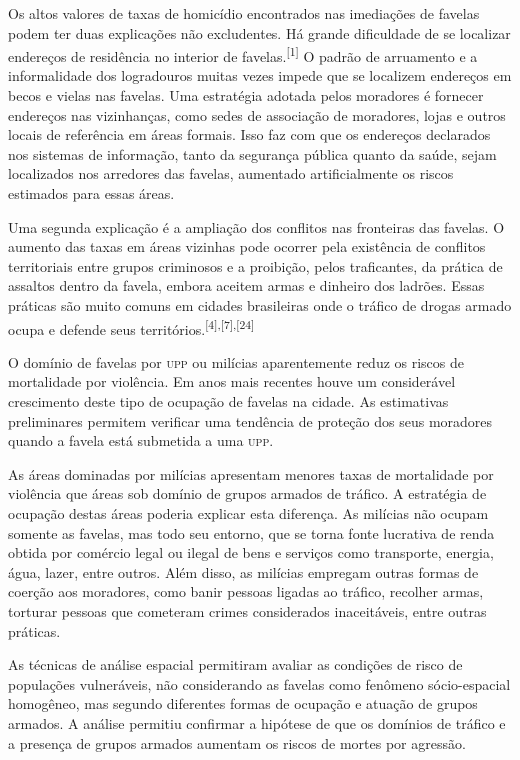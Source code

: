 \documentclass{article}
\begin{document}
Os altos valores de taxas de homicídio encontrados nas imediações de favelas
podem ter duas explicações não excludentes. Há grande dificuldade de se
localizar endereços de residência no interior de
favelas.\textsuperscript{[}\textsuperscript{1}\textsuperscript{]}
O padrão de arruamento e a informalidade dos logradouros muitas vezes impede que
se localizem endereços em becos e vielas nas favelas. Uma estratégia adotada
pelos moradores é fornecer endereços nas vizinhanças, como sedes de associação
de moradores, lojas e outros locais de referência em áreas formais. Isso faz com
que os endereços declarados nos sistemas de informação, tanto da segurança
pública quanto da saúde, sejam localizados nos arredores das favelas, aumentado
artificialmente os riscos estimados para essas áreas.

Uma segunda explicação é a ampliação dos conflitos nas fronteiras das favelas. O
aumento das taxas em áreas vizinhas pode ocorrer pela existência de conflitos
territoriais entre grupos criminosos e a proibição, pelos traficantes, da
prática de assaltos dentro da favela, embora aceitem armas e dinheiro dos
ladrões. Essas práticas são muito comuns em cidades brasileiras onde o tráfico
de drogas armado ocupa e defende seus
territórios.\textsuperscript{[}\textsuperscript{4}\textsuperscript{]}\textsuperscript{,}\textsuperscript{[}\textsuperscript{7}\textsuperscript{]}\textsuperscript{,}\textsuperscript{[}\textsuperscript{24}\textsuperscript{]}

O domínio de favelas por \textsc{upp} ou milícias aparentemente reduz os riscos de
mortalidade por violência. Em anos mais recentes houve um considerável
crescimento deste tipo de ocupação de favelas na cidade. As estimativas
preliminares permitem verificar uma tendência de proteção dos seus moradores
quando a favela está submetida a uma \textsc{upp}.

As áreas dominadas por milícias apresentam menores taxas de mortalidade por
violência que áreas sob domínio de grupos armados de tráfico. A estratégia de
ocupação destas áreas poderia explicar esta diferença. As milícias não ocupam
somente as favelas, mas todo seu entorno, que se torna fonte lucrativa de renda
obtida por comércio legal ou ilegal de bens e serviços como transporte, energia,
água, lazer, entre outros. Além disso, as milícias empregam outras formas de
coerção aos moradores, como banir pessoas ligadas ao tráfico, recolher armas,
torturar pessoas que cometeram crimes considerados inaceitáveis, entre outras
práticas.

As técnicas de análise espacial permitiram avaliar as condições de risco de
populações vulneráveis, não considerando as favelas como fenômeno sócio-espacial
homogêneo, mas segundo diferentes formas de ocupação e atuação de grupos
armados. A análise permitiu confirmar a hipótese de que os domínios de tráfico e
a presença de grupos armados aumentam os riscos de mortes por agressão.
\end{document}
